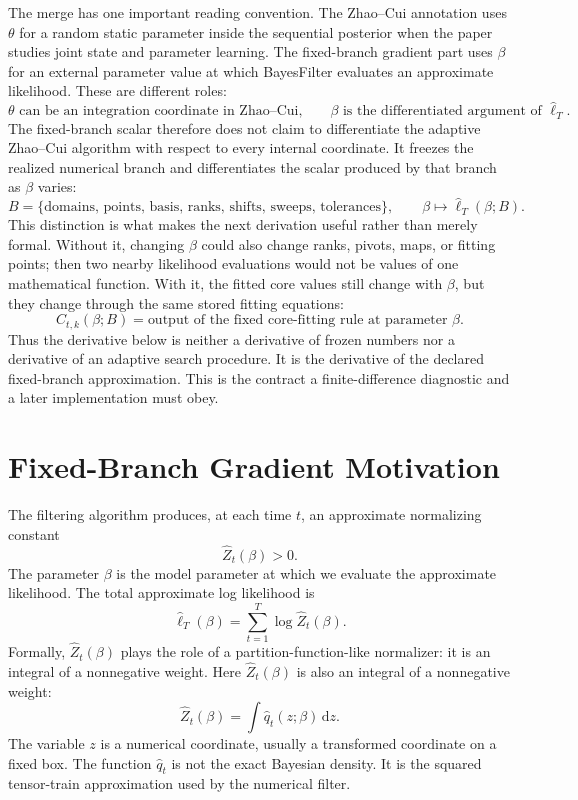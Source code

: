 \documentclass[11pt]{article}
\newcommand{\dd}{\,\mathrm d}
\newcommand{\widehatell}{\widehat\ell}
\begin{document}
The merge has one important reading convention.  The Zhao--Cui annotation uses
\(\theta\) for a random static parameter inside the sequential posterior when
the paper studies joint state and parameter learning.  The fixed-branch
gradient part uses \(\beta\) for an external parameter value at which
BayesFilter evaluates an approximate likelihood.  These are different roles:
\[
    \theta \text{ can be an integration coordinate in Zhao--Cui,}
    \qquad
    \beta \text{ is the differentiated argument of } \widehat\ell_T .
    \tag{P20-B1}
\]
The fixed-branch scalar therefore does not claim to differentiate the adaptive
Zhao--Cui algorithm with respect to every internal coordinate.  It freezes the
realized numerical branch and differentiates the scalar produced by that
branch as \(\beta\) varies:
\[
    B=\{\text{domains, points, basis, ranks, shifts, sweeps, tolerances}\},
    \qquad
    \beta\mapsto \widehat\ell_T(\beta;B).
    \tag{P20-B2}
\]
This distinction is what makes the next derivation useful rather than merely
formal.  Without it, changing \(\beta\) could also change ranks, pivots, maps,
or fitting points; then two nearby likelihood evaluations would not be values
of one mathematical function.  With it, the fitted core values still change
with \(\beta\), but they change through the same stored fitting equations:
\[
    C_{t,k}(\beta;B)
    =
    \text{output of the fixed core-fitting rule at parameter }\beta.
    \tag{P20-B3}
\]
Thus the derivative below is neither a derivative of frozen numbers nor a
derivative of an adaptive search procedure.  It is the derivative of the
declared fixed-branch approximation.  This is the contract a finite-difference
diagnostic and a later implementation must obey.

\section{Fixed-Branch Gradient Motivation}

The filtering algorithm produces, at each time \(t\), an approximate
normalizing constant
\[
    \widehat Z_t(\beta)>0.
    \tag{P19-1}
\]
The parameter \(\beta\) is the model parameter at which we evaluate the
approximate likelihood.  The total approximate log likelihood is
\[
    \widehatell_T(\beta)
    =
    \sum_{t=1}^{T}\log \widehat Z_t(\beta).
    \tag{P19-2}
\]
Formally, \(\widehat Z_t(\beta)\) plays the role of a
partition-function-like normalizer: it is an integral of a nonnegative weight.
Here
\(\widehat Z_t(\beta)\) is also an integral of a nonnegative weight:
\[
    \widehat Z_t(\beta)
    =
    \int \widehat q_t(z;\beta)\dd z.
    \tag{P19-3}
\]
The variable \(z\) is a numerical coordinate, usually a transformed coordinate
on a fixed box.  The function \(\widehat q_t\) is not the exact Bayesian
density.  It is the squared tensor-train approximation used by the numerical
filter.
\end{document}
